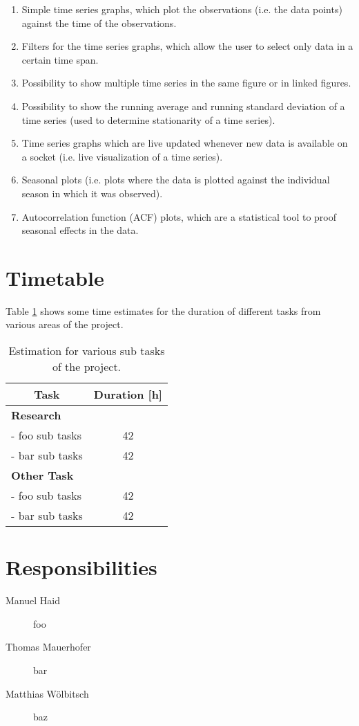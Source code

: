 \documentclass[12pt, a4paper]{article}
\begin{document}
\begin{enumerate}
 \item Simple time series graphs, which plot the observations (i.e. the data points) against the time of the observations.
 \item Filters for the time series graphs, which allow the user to select only data in a certain time span.
 \item Possibility to show multiple time series in the same figure or in linked figures.
 \item Possibility to show the running average and running standard deviation of a time series (used to determine stationarity of a time series).
 \item Time series graphs which are live updated whenever new data is available on a socket (i.e. live visualization of a time series).
 \item Seasonal plots (i.e. plots where the data is plotted against the individual season in which it was observed).
 \item Autocorrelation function (ACF) plots, which are a statistical tool to proof seasonal effects in the data.
\end{enumerate}



\section{Timetable}

Table \ref{tab:timetable} shows some time estimates for the duration of different tasks from various areas of the project. 

\begin{table}[h!]
\centering
\begin{tabular}{|l|c|}
\hline
\multicolumn{1}{|c|}{\textbf{Task}} & \textbf{Duration [h]} \\ \hline
\textbf{Research} &  \\ \hline
  - foo sub tasks & 42 \\ \hline
  - bar sub tasks & 42 \\ \hline
\textbf{Other Task} &  \\ \hline
  - foo sub tasks & 42 \\ \hline
  - bar sub tasks & 42 \\ \hline
\end{tabular}
\caption{Estimation for various sub tasks of the project.}
\label{tab:timetable}
\end{table}


\section{Responsibilities}

\begin{description}
 \item[Manuel Haid] foo
 \item[Thomas Mauerhofer] bar
 \item[Matthias Wölbitsch] baz
\end{description}
\end{document}
